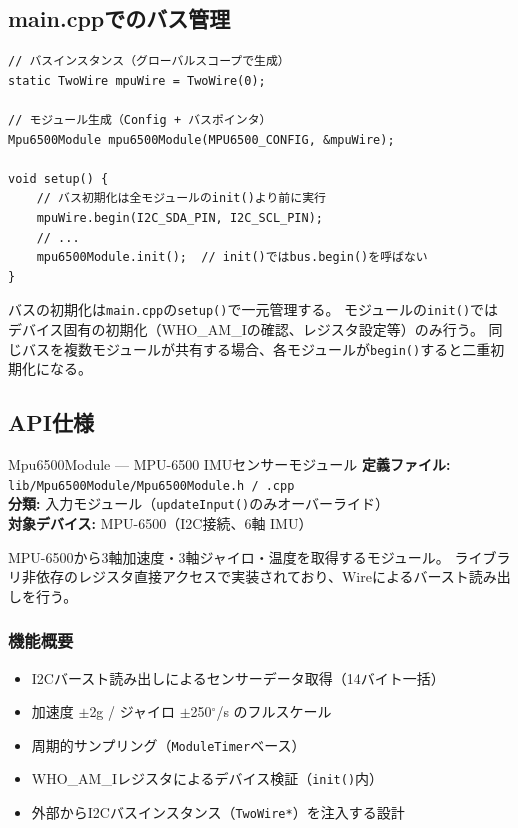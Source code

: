 \subsection{main.cppでのバス管理}

\begin{lstlisting}[style=cppstyle, caption={main.cpp — バスの生成と初期化}]
// バスインスタンス（グローバルスコープで生成）
static TwoWire mpuWire = TwoWire(0);

// モジュール生成（Config + バスポインタ）
Mpu6500Module mpu6500Module(MPU6500_CONFIG, &mpuWire);

void setup() {
    // バス初期化は全モジュールのinit()より前に実行
    mpuWire.begin(I2C_SDA_PIN, I2C_SCL_PIN);
    // ...
    mpu6500Module.init();  // init()ではbus.begin()を呼ばない
}
\end{lstlisting}

\begin{pointbox}
バスの初期化は\texttt{main.cpp}の\texttt{setup()}で一元管理する。
モジュールの\texttt{init()}ではデバイス固有の初期化（WHO\_AM\_Iの確認、レジスタ設定等）のみ行う。
同じバスを複数モジュールが共有する場合、各モジュールが\texttt{begin()}すると二重初期化になる。
\end{pointbox}

\subsection{API仕様}


\begin{apibox}{Mpu6500Module --- MPU-6500 IMUセンサーモジュール}
\textbf{定義ファイル:} \texttt{lib/Mpu6500Module/Mpu6500Module.h / .cpp}\\
\textbf{分類:} 入力モジュール（\texttt{updateInput()}のみオーバーライド）\\
\textbf{対象デバイス:} MPU-6500（I2C接続、6軸 IMU）

MPU-6500から3軸加速度・3軸ジャイロ・温度を取得するモジュール。
ライブラリ非依存のレジスタ直接アクセスで実装されており、Wireによるバースト読み出しを行う。
\end{apibox}

\subsubsection{機能概要}

\begin{itemize}
    \item I2Cバースト読み出しによるセンサーデータ取得（14バイト一括）
    \item 加速度 $\pm$2g / ジャイロ $\pm$250$^{\circ}$/s のフルスケール
    \item 周期的サンプリング（\texttt{ModuleTimer}ベース）
    \item WHO\_AM\_Iレジスタによるデバイス検証（\texttt{init()}内）
    \item 外部からI2Cバスインスタンス（\texttt{TwoWire*}）を注入する設計
\end{itemize}

